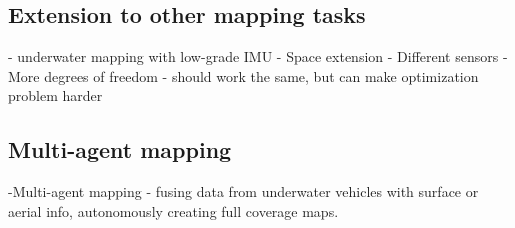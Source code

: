 \subsection{Extension to other mapping tasks}
- underwater mapping with low-grade IMU 
- Space extension 
	- Different sensors
	- More degrees of freedom - should work the same, but can make optimization problem harder
	
\subsection{Multi-agent mapping}
-Multi-agent mapping
	- fusing data from underwater vehicles with surface or aerial info, autonomously creating full coverage maps.